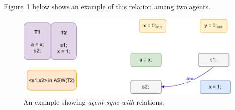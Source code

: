             Figure~\ref{model:agent-sync-with} below shows an example of this relation among two agents. 
            \begin{figure}[H]
                \centering
                \includegraphics[scale=0.7]{4.ECMAScriptMemoryModel/AgentSyncWith.pdf}
                \caption{An example showing \textit{agent-sync-with} relations.}
                \label{model:agent-sync-with}
            \end{figure}
        
